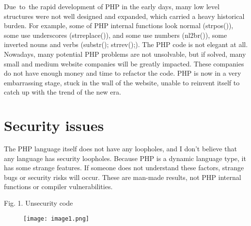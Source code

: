 \documentclass[12pt]{report}
\renewcommand{\_}{\kern-1.5pt\textunderscore\kern-1.5pt}
\begin{document}
\begin{multicols}{2}
\begin{justify}
\end{justify}
\begin{justify}
{\fontsize{10pt}{12.0pt}\selectfont Due\ to\ the rapid development of PHP in the early days, many low level structures were not well designed and expanded, which carried a heavy historical burden. For example, some of PHP internal functions look normal (strpos()), some use underscores (str\_replace()), and some use numbers (nl2br()), some inverted nouns and verbs (substr(); strrev();).  The PHP code is not elegant at all. Nowadays, many potential PHP problems are not unsolvable, but if solved, many small and medium website companies will be greatly impacted.  These companies do not have enough money and time to refactor the code. PHP is now in a very embarrassing stage, stuck in the wall of the website, unable to reinvent itself to catch up with the trend of the new era.\par}
\end{justify}

\vspace{\baselineskip}\setlength{\parskip}{3.96pt}
\section{Security issues}
\setlength{\parskip}{6.0pt}
\begin{justify}
{\fontsize{10pt}{12.0pt}\selectfont The PHP language itself does not have any loopholes, and I don't believe that any language has security loopholes. Because PHP is a dynamic language type, it has some strange features. If someone does not understand these factors, strange bugs or security risks will occur. These are man-made results, not PHP internal functions or compiler vulnerabilities. \par}
\end{justify}
\setlength{\parskip}{9.96pt}
\begin{Center}
{\fontsize{8pt}{9.6pt}\selectfont Fig. 1. Unsecurity code}
\end{Center}

\begin{figure}[H]
	\begin{Center}
		\texttt{[image: image1.png]}
	\end{Center}
\end{figure}

\setlength{\parskip}{6.0pt}


\end{multicols}
\end{document}
